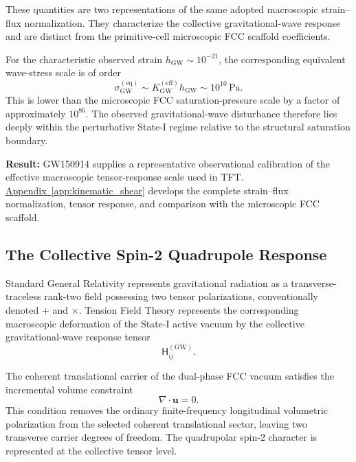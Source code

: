 These quantities are two representations of the same adopted macroscopic strain–flux normalization. They characterize the collective gravitational-wave response and are distinct from the primitive-cell microscopic FCC scaffold coefficients. 

For the characteristic observed strain $h_{\mathrm{GW}} \sim 10^{-21}$, the corresponding equivalent wave-stress scale is of order
\begin{equation}
    \sigma_{\mathrm{GW}}^{(\mathrm{eq})} \sim K_{\mathrm{GW}}^{(\mathrm{eff})} h_{\mathrm{GW}} \sim 10^{10}\,\mathrm{Pa}.
\end{equation}
This is lower than the microscopic FCC saturation-pressure scale by a factor of approximately $10^{86}$. The observed gravitational-wave disturbance therefore lies deeply within the perturbative State-I regime relative to the structural saturation boundary.

\noindent\textbf{Result:} GW150914 supplies a representative observational calibration of the effective macroscopic tensor-response scale used in TFT. \hyperref[app:kinematic_shear]{Appendix~\ref*{app:kinematic_shear}} develops the complete strain–flux normalization, tensor response, and comparison with the microscopic FCC scaffold.


\subsection{The Collective Spin-2 Quadrupole Response}
\label{subsec:collective_spin2}

Standard General Relativity represents gravitational radiation as a transverse-traceless rank-two field possessing two tensor polarizations, conventionally denoted $+$ and $\times$. Tension Field Theory represents the corresponding macroscopic deformation of the State-I active vacuum by the collective gravitational-wave response tensor
\begin{equation}
    \mathsf{H}_{ij}^{(\mathrm{GW})}.
\end{equation}

The coherent translational carrier of the dual-phase FCC vacuum satisfies the incremental volume constraint
\begin{equation}
    \nabla \cdot \mathbf{u} = 0.
\end{equation}
This condition removes the ordinary finite-frequency longitudinal volumetric polarization from the selected coherent translational sector, leaving two transverse carrier degrees of freedom. The quadrupolar spin-2 character is represented at the collective tensor level.


